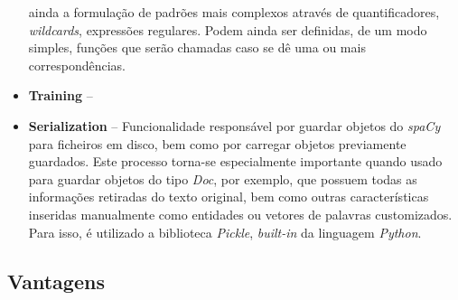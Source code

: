 \documentclass[12pt]{article}
\begin{document}
\begin{itemize}
										  ainda a formulação de padrões mais complexos através de quantificadores, \textit{wildcards}, expressões regulares. Podem ainda ser definidas,
										  de um modo simples, funções que serão chamadas caso se dê uma ou mais correspondências.
	\item \textbf{Training} --
	\item \textbf{Serialization} -- Funcionalidade responsável por guardar objetos do \textit{spaCy} para ficheiros em disco, bem como por carregar objetos previamente guardados. Este
									processo torna-se especialmente importante quando usado para guardar objetos do tipo \textit{Doc}, por exemplo, que possuem todas as informações
									retiradas do texto original, bem como outras características inseridas manualmente como entidades ou vetores de palavras customizados. Para isso, é
									utilizado  a biblioteca \textit{Pickle}, \textit{built-in} da linguagem \textit{Python}.
\end{itemize}







\subsection{Vantagens} %

\end{document}
